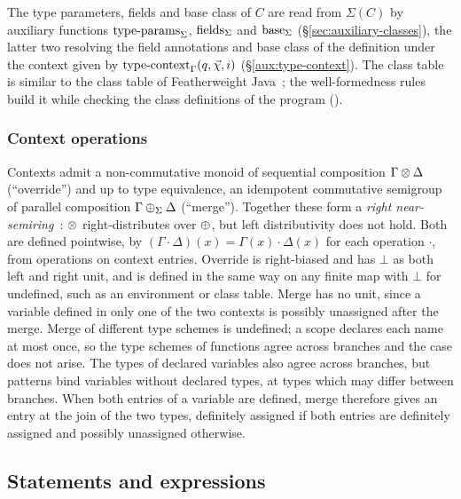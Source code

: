 
\noindent The
type parameters, fields and base class of $C$ are read from $\Sigma(C)$ by auxiliary functions
$\typeParams{\Sigma}$, $\fields{\Sigma}$ and $\base{\Sigma}$ (\S\ref{sec:auxiliary-classes}), the latter two resolving
the field annotations and base class of the definition under the context given by $\typeContext{\Gamma}(q, \seq{\chi}, i)$
(\S\ref{aux:type-context}). The class table is similar to the class table of Featherweight Java~\citep{igarashi2001}; the well-formedness rules build it while checking the class definitions of the program ().

\subsubsection{Context operations}
\label{sec:context-operations}

Contexts admit a non-commutative monoid of sequential composition $\Gamma \override \Delta$ (``override'') and
up to type equivalence, an idempotent commutative semigroup of parallel composition $\Gamma \merge_{\Sigma} \Delta$ (``merge''). Together these form a
\emph{right near-semiring}~\citep{vanhoorn1967}: $\override$ right-distributes over $\merge$, but left
distributivity does not hold. Both are defined pointwise, by $(\Gamma \cdot \Delta)(x) = \Gamma(x) \cdot \Delta(x)$
for each operation $\cdot$, from operations on context entries. Override is right-biased and has $\bot$
as both left and right unit, and is defined in the same way on any finite map with $\bot$ for undefined, such as an
environment or class table. Merge has no unit, since a variable defined in only one of the two contexts is possibly
unassigned after the merge. Merge of different type schemes is undefined; a scope declares each name at most once,
so the type schemes of functions agree across branches and the case does not arise. The types of declared variables
also agree across branches, but patterns bind variables without declared types, at types which may differ between
branches. When both entries of a variable are defined, merge therefore gives an entry at the join of the two types,
definitely assigned if both entries are definitely assigned and possibly unassigned otherwise.


\subsection{Statements and expressions}
\label{sec:expressions-statements}

